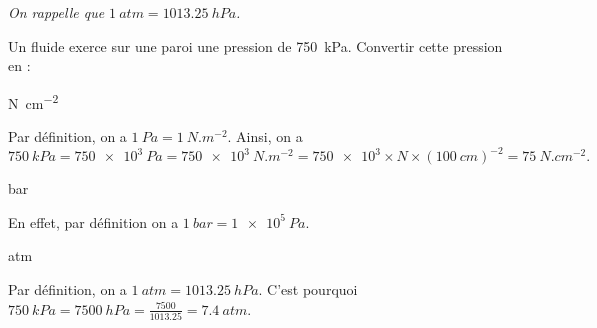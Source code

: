 {\itshape On rappelle que $\SI{1}{atm} = \SI{1013.25}{hPa}$.}

Un fluide exerce sur une paroi une pression de \SI{750}{kPa}. 
Convertir cette pression en :

\debutEntrainement


\begin{enonce}
\si{N.cm^{-2}}
\end{enonce}


\begin{corrige}
Par définition, on a $\SI{1}{Pa}=\SI{1}{N.m^{-2}}$. Ainsi, on a
\[
\SI{750}{kPa}=
\SI{750e3}{Pa}=
\SI{750e3}{N.m^{-2}}=
\num{750e3}\times \si{N}\times(\SI{100}{cm})^{-2}=
\SI{75}{N.cm^{-2}}.
\]
\end{corrige}



\begin{enonce}
bar
\end{enonce}

\begin{corrige}
En effet, par définition on a $\SI{1}{bar}=\SI{1e5}{Pa}$.
\end{corrige}


\begin{enonce}
atm
\end{enonce}

\begin{corrige}
Par définition, on a $\SI{1}{atm}=\SI{1013.25}{hPa}$. C'est pourquoi $\SI{750}{kPa}=\SI{7500}{hPa}=\frac{\num{7500}}{\num{1013.25}}=\SI{7.4}{atm}$.
\end{corrige}

\finEntrainement




